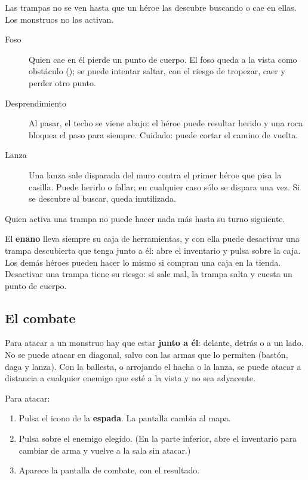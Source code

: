 Las trampas no se ven hasta que un héroe las descubre buscando o cae en
ellas. Los monstruos no las activan.

\begin{description}
\item[Foso] Quien cae en él pierde un punto de cuerpo. El foso queda a la
  vista como obstáculo (); se puede intentar saltar, con el
  riesgo de tropezar, caer y perder otro punto.
\item[Desprendimiento] Al pasar, el techo se viene abajo: el héroe puede
  resultar herido y una roca bloquea el paso para siempre. Cuidado: puede
  cortar el camino de vuelta.
\item[Lanza] Una lanza sale disparada del muro contra el primer héroe que
  pisa la casilla. Puede herirlo o fallar; en cualquier caso sólo se
  dispara una vez. Si se descubre al buscar, queda inutilizada.
\end{description}

Quien activa una trampa no puede hacer nada más hasta su turno siguiente.

El \textbf{enano} lleva siempre su caja de herramientas, y con ella puede
desactivar una trampa descubierta que tenga junto a él: abre el inventario
y pulsa sobre la caja. Los demás héroes pueden hacer lo mismo si compran
una caja en la tienda. Desactivar una trampa tiene su riesgo: si sale mal,
la trampa salta y cuesta un punto de cuerpo.

\subsection{El combate}

Para atacar a un monstruo hay que estar \textbf{junto a él}: delante,
detrás o a un lado. No se puede atacar en diagonal, salvo con las armas que
lo permiten (bastón, daga y lanza). Con la ballesta, o arrojando el hacha o
la lanza, se puede atacar a distancia a cualquier enemigo que esté a la
vista y no sea adyacente.

Para atacar:

\begin{enumerate}
\item Pulsa el icono de la \textbf{espada}. La pantalla cambia al mapa.
\item Pulsa sobre el enemigo elegido. (En la parte inferior, 
  abre el inventario para cambiar de arma y  vuelve a la
  sala sin atacar.)
\item Aparece la pantalla de combate, con el resultado.
\end{enumerate}

